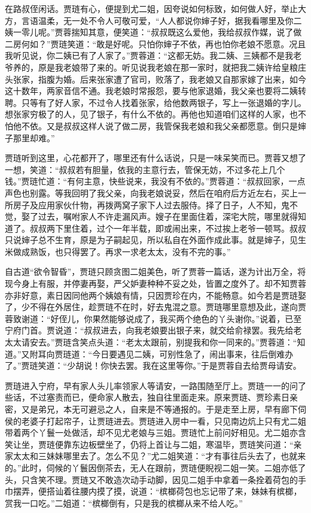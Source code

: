 \documentclass[12pt,oneside]{book}
\begin{document}
在路叔侄闲话。贾琏有心，便提到尤二姐，因夸说如何标致，如何做人好，举止大方，言语温柔，无一处不令人可敬可爱，“人人都说你婶子好，据我看哪里及你二姨一零儿呢。”贾蓉揣知其意，便笑道：“叔叔既这么爱他，我给叔叔作媒，说了做二房何如？”贾琏笑道：“敢是好呢。只怕你婶子不依，再也怕你老娘不愿意。况且我听见说，你二姨已有了人家了。”贾蓉道：“这都无妨。我二姨、三姨都不是我老爷养的，原是我老娘带了来的。听见说我老娘在那一家时，就把我二姨许给皇粮庄头张家，指腹为婚。后来张家遭了官司，败落了，我老娘又自那家嫁了出来，如今这十数年，两家音信不通。我老娘时常报怨，要与他家退婚，我父亲也要将二姨转聘。只等有了好人家，不过令人找着张家，给他数两银子，写上一张退婚的字儿。想张家穷极了的人，见了银子，有什么不依的。再他也知道咱们这样的人家，也不怕他不依。又是叔叔这样人说了做二房，我管保我老娘和我父亲都愿意。倒只是婶子那里却难。”

贾琏听到这里，心花都开了，哪里还有什么话说，只是一味呆笑而已。贾蓉又想了一想，笑道：“叔叔若有胆量，依我的主意行去，管保无妨，不过多花上几个钱。”贾琏忙道：“有何主意，快些说来，我没有不依的。”贾蓉道：“叔叔回家，一点声色也别露。等我回明了我父亲，向我老娘说妥，然后在咱府后方近左右，买上一所房子及应用家伙什物，再拨两窝子家下人过去服侍。择了日子，人不知，鬼不觉，娶了过去，嘱咐家人不许走漏风声。嫂子在里面住着，深宅大院，哪里就得知道了。叔叔两下里住着，过个一年半载，即或闹出来，不过挨上老爷一顿骂。叔叔只说婶子总不生育，原是为子嗣起见，所以私自在外面作成此事。就是婶子，见生米做成熟饭，也只得罢了。再求一求老太太，没有不完的事。”

自古道“欲令智昏”，贾琏只顾贪图二姐美色，听了贾蓉一篇话，遂为计出万全，将现今身上有服，并停妻再娶，严父妒妻种种不妥之处，皆置之度外了。却不知贾蓉亦非好意，素日因同他两个姨娘有情，只因贾珍在内，不能畅意。如今若是贾琏娶了，少不得在外居住，趁贾琏不在时，好去鬼混之意。贾琏哪里意想及此，遂向贾蓉致谢道：“好侄儿，你果然能够说成了，我买两个绝色的丫头谢你。”说着，已至宁府门首。贾说道：“叔叔进去，向我老娘要出银子来，就交给俞禄罢。我先给老太太请安去。”贾琏含笑点头道：“老太太跟前，别提我和你一同来的。”贾蓉道：“知道。”又附耳向贾琏道：“今日要遇见二姨，可别性急了，闹出事来，往后倒难办了。”贾琏笑道：“少胡说！你快去罢。我在这里等你。”于是贾蓉自去给贾母请安。

贾琏进入宁府，早有家人头儿率领家人等请安，一路围随至厅上。贾琏一一的问了些话，不过塞责而已，便命家人散去，独自往里面走来。原来贾琏、贾珍素日亲密，又是弟兄，本无可避忌之人，自来是不等通报的。于是走至上房，早有廊下伺侯的老婆子打起帘子，让贾琏进去。贾琏进入房中一看，只见南边炕上只有尤二姐带着两个丫鬟一处做活，却不见尤老娘与三姐。贾琏忙上前问好相见。尤二姐亦含笑让坐，贾琏便靠东边板壁坐了，仍将上首让与二姐，寒温毕，贾琏笑问道：“亲家太太和三妹妹哪里去了。怎么不见？”尤二姐笑道：“才有事往后头去了，也就来的。”此时，伺候的丫鬟因倒茶去，无人在跟前，贾琏便睨视二姐一笑。二姐亦低了头，只含笑不理。贾琏又不敢造次动手动脚，因见二姐手中拿着一条拴着荷包的手巾摆弄，便搭讪着往腰内摸了摸，说道：“槟榔荷包也忘记带了来，妹妹有槟榔，赏我一口吃。”二姐道：“槟榔倒有，只是我的槟榔从来不给人吃。”
\end{document}
